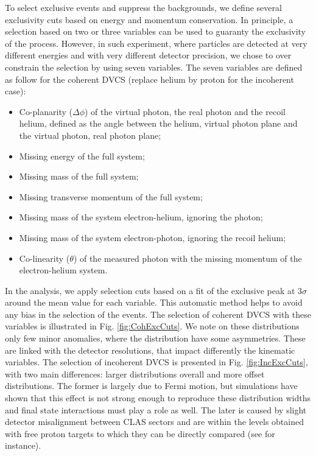 \documentclass[aps,prc,preprint,superscriptaddress]{revtex4}
\begin{document}
To select exclusive events and suppress the backgrounds, we define several 
exclusivity cuts based on energy and momentum conservation. In principle, 
a selection based on two or three variables can be used to guaranty the 
exclusivity of the process. However, in such experiment, where particles 
are detected at very different energies and with very different detector 
precision, we chose to over constrain the selection by using seven 
variables. The seven variables are defined as follow for the coherent 
DVCS (replace helium by proton for the incoherent case):
\begin{itemize}
	\item Co-planarity ($\Delta \phi$) of the virtual photon, the real photon and
		the recoil helium, defined as the angle between the helium, virtual photon
		plane and the virtual photon, real photon plane;
	\item Missing energy of the full system;
	\item Missing mass of the full system;
	\item Missing transverse momentum of the full system;
	\item Missing mass of the system electron-helium, ignoring the photon;
	\item Missing mass of the system electron-photon, ignoring the recoil helium;
	\item Co-linearity ($\theta$) of the measured photon with the missing momentum of the 
		electron-helium system.
\end{itemize}

In the analysis, we apply selection cuts based on a fit of the exclusive peak at 3$\sigma$ around 
the mean value for each variable. This automatic method helps to avoid any bias 
in the selection of the events. The selection of coherent DVCS with these variables is illustrated in 
Fig. \ref{fig:CohExcCuts}. We note on these distributions only few minor anomalies, where the 
distribution have some asymmetries. These are linked with the detector resolutions, that impact
differently the kinematic variables. The selection of incoherent DVCS is presented in 
Fig. \ref{fig:IncExcCuts}, with two main differences: larger distributions overall and more
offset distributions. The former is largely due to Fermi motion, but simulations have shown
that this effect is not strong enough to reproduce these distribution widths and final 
state interactions must play a role as well. The later is caused by slight detector 
misalignment between CLAS sectors and are within the levels obtained with free proton 
targets to which they can be directly compared (see \cite{HirlingerSaylor:2018bnu} for instance). 
\end{document}
